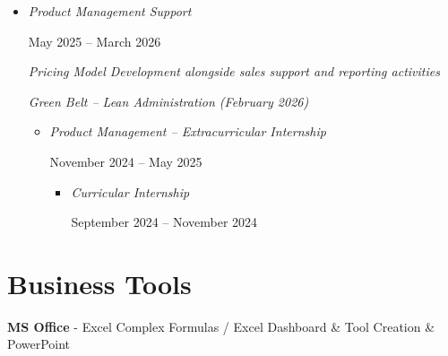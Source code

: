 \documentclass[10pt,a4paper]{article}
\begin{document}
\begin{itemize}[
    leftmargin=5mm,
    itemsep=0pt,
    label={-}
]

\item
\textit{Product Management Support}

\par
May 2025 -- March 2026

\vspace{1pt}

{\small
\textit{
Pricing Model Development alongside sales support
and reporting activities
}
\par
\textit{
Green Belt -- Lean Administration
(February 2026)}
}


\begin{itemize}[
    leftmargin=8mm,
    itemsep=2pt,
    label={-}
]

\item
\textit{
Product Management -- Extracurricular Internship
}

\par
November 2024 -- May 2025


\begin{itemize}[
    leftmargin=8mm,
    itemsep=2pt,
    label={-}
]

\item
\textit{
Curricular Internship
}

\par
September 2024 -- November 2024

\end{itemize}

\end{itemize}

\end{itemize}


\section*{Business Tools}

\vspace{6pt}

\textbf{MS Office}
{\small
- Excel Complex Formulas / Excel Dashboard \& Tool Creation \& PowerPoint
}
\end{document}
